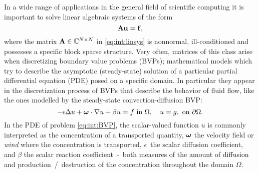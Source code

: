 In a wide range of applications in the general field of scientific computing it
is important to solve linear algebraic systems of the form
\begin{equation}
\label{eq:int:linsys}
\mathbf{A}\mathbf{u}=\mathbf{f},
\end{equation}
where the matrix
$\mathbf{A}\in\mathbb{C}^{N\times N}$ in \eqref{eq:int:linsys} is nonnormal,
ill-conditioned and possesses a specific block sparse structure.
Very often, matrices of this class arise when discretizing boundary value
problems (BVPs); mathematical models which try to describe the asymptotic
(steady-state) solution of a particular partial differential equation (PDE)
posed on a specific domain. In particular they appear in the discretization
process of BVPs that describe the behavior of fluid flow, like the ones
modelled by the steady-state convection-diffusion BVP:
\begin{equation}
\label{eq:int:BVP}
-\epsilon \Delta u + \om\cdot\nabla u + \beta u = f
\text{ in } \Omega, %
\quad u = g,
\text{ on } \partial\Omega.
\end{equation}
In the PDE of problem \eqref{eq:int:BVP}, the scalar-valued function $u$ is
commonly interpreted as the concentration of a transported quantity, $\bm{\omega}$ the
velocity field or \textit{wind} where the concentration is transported,
$\epsilon$~the scalar diffusion coefficient, and $\beta$ the scalar reaction
coefficient~-~both measures of the amount of diffusion and
production~/~destruction of the concentration throughout the domain $\Omega$.

